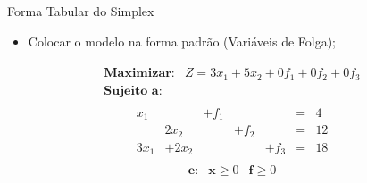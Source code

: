 \documentclass{if-beamer}
\begin{document}

\begin{frame}{Forma Tabular do Simplex}

\begin{itemize}
    \item {} Colocar o modelo na forma padrão (Variáveis de Folga);
\end{itemize}

\begin{align*}
\begin{matrix}
    \textbf{Maximizar:} & Z = 3x_1 + 5x_2 + 0f_1 + 0f_2 + 0f_3 \\
    \textbf{Sujeito a:} & 
\end{matrix}
\end{align*}
\vspace{-.6cm}
\begin{align*}
\begin{matrix}
     x_1 &        & + f_1 &       &       & = & 4  \\ 
         &   2x_2 &       & + f_2 &       & = & 12 \\
    3x_1 & + 2x_2 &       &       & + f_3 & = & 18
\end{matrix}
\end{align*}
\begin{align*}
\begin{matrix}
    \textbf{e:} & \mathbf{x} \geq 0 & \mathbf{f} \geq 0
\end{matrix}
\end{align*}

\end{frame}

\end{document}
